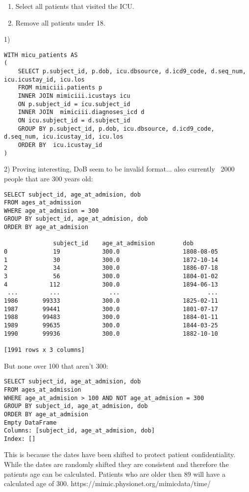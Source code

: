 \begin{enumerate}
	\item Select all patients that visited the ICU.
	\item Remove all patients under 18.
\end{enumerate}

1)
\begin{lstlisting}
WITH micu_patients AS
(
    SELECT p.subject_id, p.dob, icu.dbsource, d.icd9_code, d.seq_num, icu.icustay_id, icu.los
    FROM mimiciii.patients p
    INNER JOIN mimiciii.icustays icu
    ON p.subject_id = icu.subject_id
    INNER JOIN  mimiciii.diagnoses_icd d
    ON icu.subject_id = d.subject_id
    GROUP BY p.subject_id, p.dob, icu.dbsource, d.icd9_code, d.seq_num, icu.icustay_id, icu.los
    ORDER BY  icu.icustay_id
)
\end{lstlisting}

2)
Proving interesting, DoB seem to be invalid format... also currently ~2000 people that are 300 years old:
\begin{lstlisting}
SELECT subject_id, age_at_admision, dob
FROM ages_at_admission
WHERE age_at_admision = 300
GROUP BY subject_id, age_at_admision, dob
ORDER BY age_at_admision

              subject_id    age_at_admision        dob
0             19            300.0                  1808-08-05
1             30            300.0                  1872-10-14
2             34            300.0                  1886-07-18
3             56            300.0                  1804-01-02
4            112            300.0                  1894-06-13
 ...         ...              ...                         ...
1986       99333            300.0                  1825-02-11
1987       99441            300.0                  1801-07-17
1988       99483            300.0                  1884-01-11
1989       99635            300.0                  1844-03-25
1990       99936            300.0                  1882-10-10

[1991 rows x 3 columns]
\end{lstlisting}

But none over 100 that aren't 300:
\begin{lstlisting}
SELECT subject_id, age_at_admision, dob
FROM ages_at_admission
WHERE age_at_admision > 100 AND NOT age_at_admision = 300 
GROUP BY subject_id, age_at_admision, dob
ORDER BY age_at_admision
Empty DataFrame
Columns: [subject_id, age_at_admision, dob]
Index: []
\end{lstlisting}

This is because the dates have been shifted to protect patient confidentiality. While the dates are randomly shifted they are consistent and therefore the patients age can be calculated. Patients who are older then 89 will have a calculated age of 300. https://mimic.physionet.org/mimicdata/time/